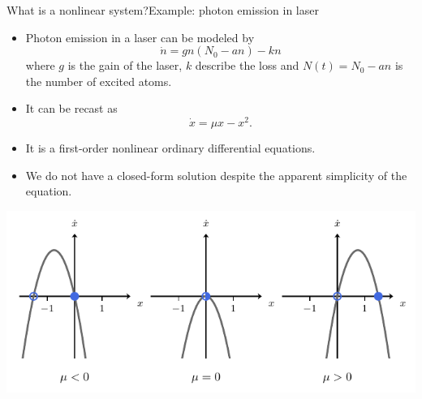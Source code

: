 \documentclass[usenames,dvipsnames,svgnames,10pt,aspectratio=169]{beamer}
\begin{document}
\begin{frame}[t, c]{What is a nonlinear system?}{Example: photon emission in laser}
	\begin{minipage}{.58\textwidth}
		\begin{itemize}
			\item Photon emission in a laser can be modeled by
			\[
				\dot{n} = gn(N_0 - an) - kn
			\]
			where \(g\) is the gain of the laser, \(k\) describe the loss and \(N(t) = N_0 - an\) is the number of excited atoms.

			\medskip

			\item It can be recast as
			\[
				\dot{x} = \mu x - x^2.
			\]

			\item It is a first-order nonlinear ordinary differential equations.

			\medskip

			\item We do not have a closed-form solution despite the apparent simplicity of the equation.

		\end{itemize}
	\end{minipage}%
	\hfill
	\begin{minipage}{.38\textwidth}
		\hspace{-0.75cm} \includegraphics[width=1.2\textwidth]{transcritical_phase_line}
	\end{minipage}

	\vspace{1cm}
\end{frame}
\end{document}
